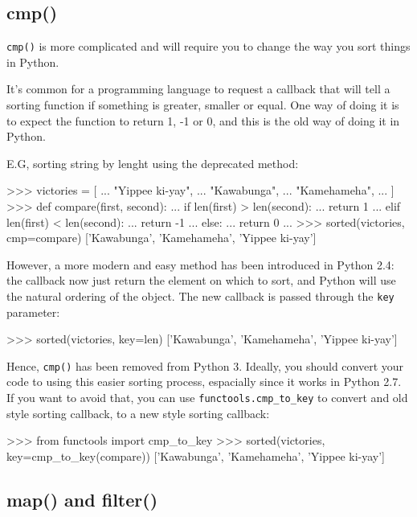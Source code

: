 \subsection{cmp()}

\lstinline{cmp()} is more complicated and will require you to change the way you sort things in Python.

It's common for a programming language to request a callback that will tell a sorting function if something is greater, smaller or equal. One way of doing it is to expect the function to return 1, -1 or 0, and this is the old way of doing it in Python.

E.G, sorting string by lenght using the deprecated method:

\begin{py}
>>> victories = [
...     "Yippee ki-yay",
...     "Kawabunga",
...     "Kamehameha",
... ]
>>> def compare(first, second):
...     if len(first) > len(second):
...         return 1
...     elif len(first) < len(second):
...         return -1
...     else:
...         return 0
...
>>> sorted(victories, cmp=compare)
['Kawabunga', 'Kamehameha', 'Yippee ki-yay']
\end{py}

However, a more modern and easy method has been introduced in Python 2.4: the callback now just return the element on which to sort, and Python will use the natural ordering of the object. The new callback is passed through the \lstinline{key} parameter:

\begin{py}
>>> sorted(victories, key=len)
['Kawabunga', 'Kamehameha', 'Yippee ki-yay']
\end{py}

Hence, \lstinline{cmp()} has been removed from Python 3. Ideally, you should convert your code to using this easier sorting process, espacially since it works in Python 2.7. If you want to avoid that, you can use \lstinline{functools.cmp_to_key} to convert and old style sorting callback, to a new style sorting callback:

\begin{py}
>>> from functools import cmp_to_key
>>> sorted(victories, key=cmp_to_key(compare))
['Kawabunga', 'Kamehameha', 'Yippee ki-yay']
\end{py}


\subsection{map() and filter()}

